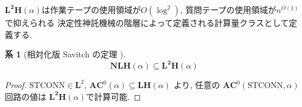 \documentclass[11pt,a4paper]{jsarticle}
\theoremstyle{definition}
\newtheorem{corollary}[theorem]{系}
\theoremstyle{remark}
\newcommand{\classfont}{\mathbf}
\newcommand{\AC}{\classfont{AC}}
\renewcommand{\L}{\classfont{L}}
\newcommand{\LH}{\classfont{LH}}
\newcommand{\NLH}{\classfont{NLH}}
\newcommand{\probfont}{\text}
\newcommand{\STCONN}{\probfont{STCONN}}
\begin{document}
$\classfont{L^2H}(\alpha)$は作業テープの使用領域が$O(\log^2)$,
質問テープの使用領域が$n^{O(1)}$で抑えられる
決定性神託機械の階層によって定義される計算量クラスとして定義する.
\begin{corollary}[相対化版 Savitch の定理
{\cite{savitch1970relationships}}]
\label{corollary:end}
\begin{equation*}
 \NLH(\alpha) \subseteq \classfont{L^2H}(\alpha)
\end{equation*}
\end{corollary}

\begin{proof}
 $\STCONN \in \L^2$, $\AC^0(\alpha) \subseteq \LH(\alpha)$ より, 
 任意の $\AC^0(\STCONN, \alpha)$ 回路の値は
 $\classfont{L^2H}(\alpha)$で計算可能.
\end{proof}


\end{document}
